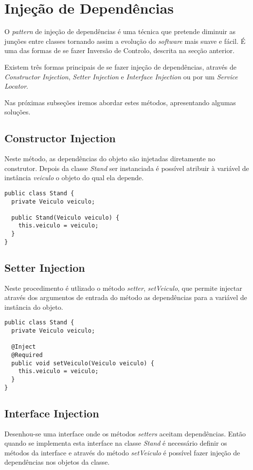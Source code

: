 \section{Injeção de Dependências}

O \textit{pattern} de injeção de dependências é uma técnica que pretende diminuir as junções entre classes tornando assim a evolução do \textit{software} mais suave e fácil. É uma das formas de se fazer Inversão de Controlo, descrita na secção anterior.

Existem três formas principais de se fazer injeção de dependências, através de \textit{Constructor Injection}, \textit{Setter Injection} e \textit{Interface Injection} ou por um \textit{Service Locator}.

Nas próximas subseções iremos abordar estes métodos, apresentando algumas soluções.

\subsection{Constructor Injection}
Neste método, as dependências do objeto são injetadas diretamente no construtor. Depois da classe \textit{Stand} ser instanciada é possível atribuir à variável de instância \textit{veiculo} o objeto do qual ela depende.

\begin{lstlisting}[caption=Injeção pelo Construtor]
public class Stand {
  private Veiculo veiculo;

  public Stand(Veiculo veiculo) {
    this.veiculo = veiculo;
  }
}
\end{lstlisting}

\subsection{Setter Injection}
Neste procedimento é utlizado o método \textit{setter}, \textit{setVeiculo}, que permite injectar através dos argumentos de entrada do método as dependências para a variável de instância do objeto.

\begin{lstlisting}[caption=Injeção pelo Setter]
public class Stand {
  private Veiculo veiculo;

  @Inject
  @Required
  public void setVeiculo(Veiculo veiculo) {
    this.veiculo = veiculo;
  }
}
\end{lstlisting}

\subsection{Interface Injection}
Desenhou-se uma interface onde os métodos \textit{setters} aceitam dependências. Então quando se implementa esta interface na classe \textit{Stand} é necessário definir os métodos da interface e através do método \textit{setVeiculo} é possível fazer injeção de dependências nos objetos da classe.

